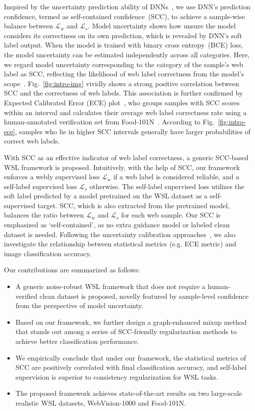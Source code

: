 \documentclass[runningheads]{llncs}
\begin{document}
Inspired by the uncertainty prediction ability of DNNs~\cite{gal2016uncertainty}, we use DNN's prediction confidence, termed as self-contained confidence~(SCC), to achieve a sample-wise balance between $\mathcal{L}_w$ and $\mathcal{L}_s$. 
Model uncertainty shows how unsure the model considers its correctness on its own prediction, which is revealed by DNN's soft label output. 
When the model is trained with binary cross entropy~(BCE) loss, the model uncertainty can be estimated independently across all categories.
Here, we regard model uncertainty corresponding to the category of the sample's web label as SCC, reflecting the likelihood of web label correctness from the model's scope~\cite{gal2016uncertainty}.
Fig.~\ref{fig:intro-img} vividly shows a strong positive correlation between SCC and the correctness of web labels. This association is further confirmed by Expected Calibrated Error (ECE) plot~\cite{guo2017calibration}, who groups samples with SCC scores within an interval and calculates their average web label correctness rate using a human-annotated verification set from Food-101N~\cite{lee2018cleannet}. According to Fig.~\ref{fig:intro-ece}, samples who lie in higher SCC intervals generally have larger probabilities of correct web labels.

With SCC as an effective indicator of web label correctness, a generic SCC-based WSL framework is proposed. Intuitively, with the help of SCC, our framework enforces a webly supervised loss $\mathcal{L}_w$ if a web label is considered reliable, and a self-label supervised loss $\mathcal{L}_s$ otherwise. The self-label supervised loss utilizes the soft label predicted by a model pretrained on the WSL dataset as a self-supervised target. SCC, which is also extracted from the pretrained model, balances the ratio between $\mathcal{L}_w$ and $\mathcal{L}_s$ for each web sample. Our SCC is emphasized as `self-contained', as no extra guidance model or labeled clean dataset is needed. 
Following the uncertainty calibration approaches~\cite{guo2017calibration,thulasidasan2019mixup}, we also investigate the relationship between statistical metrics (e.g. ECE metric) and image classification accuracy.

Our contributions are summarized as follows:
\begin{itemize}
	\item A generic noise-robust WSL framework that does not require a human-verified clean dataset is proposed, novelly featured by sample-level confidence from the perspective of model uncertainty.
	\item Based on our framework, we further design a graph-enhanced mixup method that stands out among a series of SCC-friendly regularization methods to achieve better classification performance.
    \item We empirically conclude that under our framework, the statistical metrics of SCC are positively correlated with final classification accuracy, and self-label supervision is superior to consistency regularization for WSL tasks.
	\item The proposed framework achieves state-of-the-art results on two large-scale realistic WSL datasets,  WebVision-1000 and Food-101N.
\end{itemize}
\end{document}
